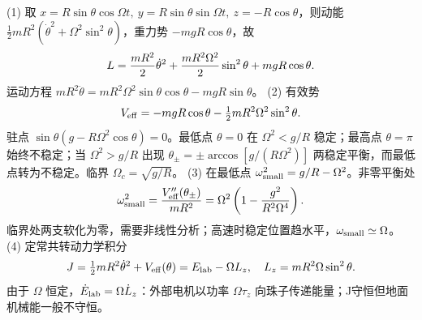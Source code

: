 (1) 取 \(x=R\sin\theta\cos\Omega t,\ y=R\sin\theta\sin\Omega t,\ z=-R\cos\theta\)，则动能 \(\frac12mR^2(\dot\theta^2+\Omega^2\sin^2\theta)\)，重力势 \(-mgR\cos\theta\)，故
\[
L={mR^2\over2}\dot\theta^2+{mR^2\Omega^2\over2}\sin^2\theta+mgR\cos\theta.
\]
运动方程 \(mR^2\ddot\theta=mR^2\Omega^2\sin\theta\cos\theta-mgR\sin\theta\)。
(2) 有效势
\[
V_{\rm eff}=-mgR\cos\theta-\tfrac12mR^2\Omega^2\sin^2\theta.
\]
驻点 \(\sin\theta(g-R\Omega^2\cos\theta)=0\)。最低点 \(\theta=0\) 在 \(\Omega^2<g/R\) 稳定；最高点 \(\theta=\pi\) 始终不稳定；当 \(\Omega^2>g/R\) 出现 \(\theta_\pm=\pm\arccos[g/(R\Omega^2)]\) 两稳定平衡，而最低点转为不稳定。临界 \(\Omega_c=\sqrt{g/R}\)。
(3) 在最低点 \(\omega_{\rm small}^2=g/R-\Omega^2\)。非零平衡处
\[
\omega_{\rm small}^2={V_{\rm eff}''(\theta_\pm)\over mR^2}
=\Omega^2\left(1-{g^2\over R^2\Omega^4}\right).
\]
临界处两支软化为零，需要非线性分析；高速时稳定位置趋水平，\(\omega_{\rm small}\simeq\Omega\)。
(4) 定常共转动力学积分
\[
J=\tfrac12mR^2\dot\theta^2+V_{\rm eff}(\theta)
=E_{\rm lab}-\Omega L_z,
\quad L_z=mR^2\Omega\sin^2\theta.
\]
由于 \(\Omega\) 恒定，\(\dot E_{\rm lab}=\Omega\dot L_z\)：外部电机以功率 \(\Omega\tau_z\) 向珠子传递能量；J守恒但地面机械能一般不守恒。
